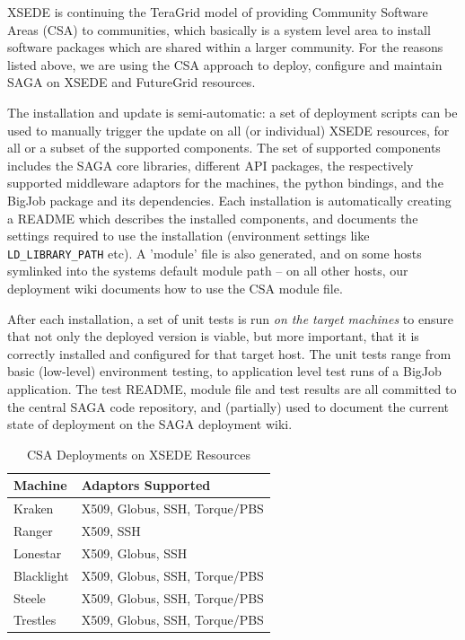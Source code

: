 \documentclass{sig-alternate}
\begin{document}
 XSEDE is continuing the TeraGrid model of providing Community
 Software Areas (CSA) to communities, which basically is a system
 level area to install software packages which are shared within a
 larger community.  For the reasons listed above, we are using the CSA
 approach to deploy, configure and maintain SAGA on XSEDE and
 FutureGrid resources.

 The installation and update is semi-automatic: a set of deployment
 scripts can be used to manually trigger the update on all (or
 individual) XSEDE resources, for all or a subset of the supported
 components.  The set of supported components includes the SAGA core
 libraries, different API packages, the respectively supported
 middleware adaptors for the machines, the python bindings, and the
 BigJob package and its dependencies.  Each installation is
 automatically creating a README which describes the installed
 components, and documents the settings required to use the
 installation (environment settings like \texttt{LD\_LIBRARY\_PATH} etc).  A
 'module' file is also generated, and on some hosts symlinked into the
 systems default module path -- on all other hosts, our deployment
 wiki documents how to use the CSA module file.

 After each installation, a set of unit tests is run \textit{on the
 target machines} to ensure that not only the deployed version is
 viable, but more important, that it is correctly installed and
 configured for that target host.  The unit tests range from basic
 (low-level) environment testing, to application level test runs of a
 BigJob application.  The test README, module file and test results
 are all committed to the central SAGA code repository, and
 (partially) used to document the current state of deployment on the
 SAGA deployment wiki.

\begin{table}
\begin{center}
\begin{tabular}{ll}
\toprule
\textbf{Machine}  & 
\textbf{Adaptors Supported} 
\\ \midrule
Kraken   & 
X509, Globus, SSH, Torque/PBS
\\ \midrule
Ranger   & 
X509, SSH
\\ \midrule
Lonestar & 
X509, Globus, SSH
\\ \midrule
Blacklight & 
X509, Globus, SSH, Torque/PBS
\\ \midrule
Steele & 
X509, Globus, SSH, Torque/PBS
\\ \midrule
Trestles & 
X509, Globus, SSH, Torque/PBS
\\ \bottomrule
\end{tabular}
\caption{CSA Deployments on XSEDE Resources}
\label{table:CSA-Deployments}
\end{center}
\end{table}
\end{document}
